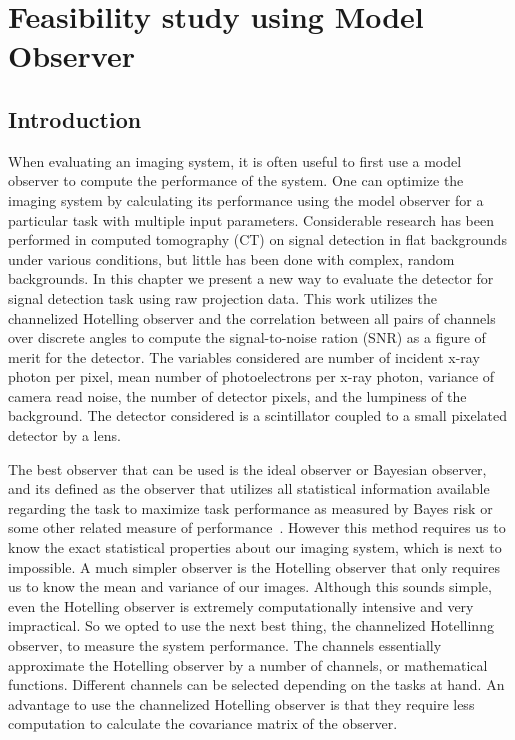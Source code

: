 \chapter{Feasibility study using Model Observer}
\label{chap:model_observer}

\section{Introduction}
When evaluating an imaging system, it is often useful to first use a model observer to compute the performance of the system.  One can optimize the imaging system by calculating its performance using the model observer for a particular task with multiple input parameters.  Considerable research has been performed in computed tomography (CT) on signal detection in flat backgrounds under various conditions, but little has been done with complex, random backgrounds.  In this chapter we present a new way to evaluate the detector for signal detection task using raw projection data.  This work utilizes the channelized Hotelling observer and the correlation between all pairs of channels over discrete angles to compute the signal-to-noise ration (SNR) as a figure of merit for the detector.  The variables considered are number of incident x-ray photon per pixel, mean number of photoelectrons per x-ray photon, variance of camera read noise, the number of detector pixels, and the lumpiness of the background.  The detector considered is a scintillator coupled to a small pixelated detector by a lens.

The best observer that can be used is the ideal observer or Bayesian observer, and its defined as the observer that utilizes all statistical information available regarding the task to maximize task performance as measured by Bayes risk or some other related measure of performance~\citep{Barrett2004}.  However this method requires us to know the exact statistical properties about our imaging system, which is next to impossible.  A much simpler observer is the Hotelling observer that only requires us to know the mean and variance of our images.  Although this sounds simple, even the Hotelling observer is extremely computationally intensive and very impractical.  So we opted to use the next best thing, the channelized Hotellinng observer,  to measure the system performance.  
The channels essentially approximate the Hotelling observer by a number of channels, or mathematical functions.  Different channels can be selected depending on the tasks at hand.  An advantage to use the channelized Hotelling observer is that they require less computation to calculate the covariance matrix of the observer.

